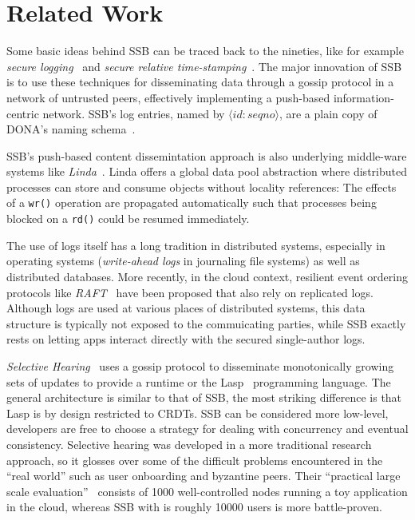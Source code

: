 \documentclass[10pt,sigconf,rewiew]{acmart}
\begin{document}
\section{Related Work}
\label{sect:relwork}

Some basic ideas behind SSB can be traced back to the nineties, like
for example {\em secure logging}~\cite{schneier1998cryptographic} and {\em secure
relative time-stamping}~\cite{haber1990time}. The major innovation of
SSB is to use these techniques for disseminating data through a gossip
protocol in a network of untrusted peers, effectively implementing a
push-based information-centric network. SSB's log entries, named by $\langle id:seqno\rangle$, are a plain copy of DONA's naming schema~\cite{Koponen:2007:DNA:1282380.1282402}.

SSB's push-based content dissemintation approach is also
underlying middle-ware systems like
{\em Linda}~\cite{Gelernter:1985:GCL:2363.2433}. Linda offers a global data
pool abstraction where distributed processes can store and consume
objects without locality references: The effects of a {\tt wr()}
operation are propagated automatically such that processes being
blocked on a {\tt rd()} could be resumed immediately.

The use of logs itself has a long tradition in distributed systems,
especially in operating systems ({\em write-ahead logs} in journaling file
systems) as well as distributed databases. More recently, in the cloud
context, resilient event ordering protocols like
{\em RAFT}~\cite{DBLP:conf/usenix/OngaroO14} have been proposed that also
rely on replicated logs. Although logs are used at various places of
distributed systems, this data structure is typically not exposed to
the commuicating parties, while SSB exactly rests on letting apps
interact directly with the secured single-author logs.

\textit{Selective Hearing}~\cite{meiklejohn2015selective} uses a gossip protocol to disseminate monotonically growing sets of updates to provide a runtime or the Lasp~\cite{meiklejohn2015lasp} programming language. The general architecture is similar to that of SSB, the most striking difference is that Lasp is by design restricted to CRDTs. SSB can be considered more low-level, developers are free to choose a strategy for dealing with concurrency and eventual consistency. Selective hearing was developed in a more traditional research approach, so it glosses over some of the difficult problems encountered in the ``real world'' such as user onboarding and byzantine peers. Their ``practical large scale evaluation''~\cite{meiklejohn2017lasp} consists of 1000 well-controlled nodes running a toy application in the cloud, whereas SSB with is roughly 10000 users is more battle-proven.
\end{document}
